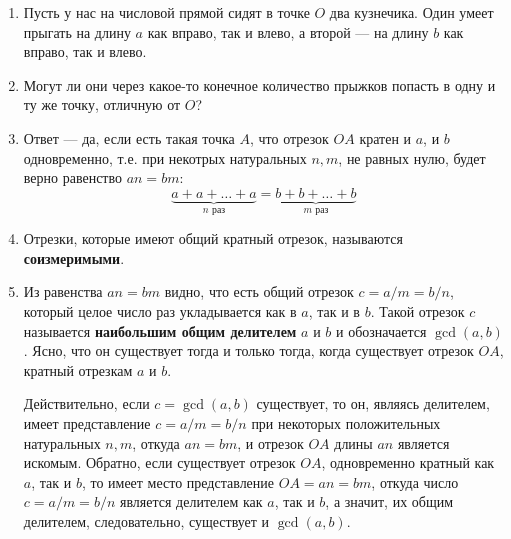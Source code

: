 \begin{enumerate}
\item Пусть у нас на числовой прямой сидят в точке $O$ два кузнечика. Один умеет прыгать на длину $a$ как вправо, так и влево, а второй --- на длину $b$ как вправо, так и влево.

\item Могут ли они через какое-то конечное количество прыжков попасть в одну и ту же точку, отличную от $O$?
\item Ответ --- да, если есть такая точка $A$, что отрезок $OA$ кратен и $a$, и $b$ одновременно, т.е. при некотрых натуральных $n,m$, не равных нулю, будет верно равенство $an=bm$:
$$
\underbrace{a+a+\dots+a}_{n\mbox{ раз}}=\underbrace{b+b+\dots+b}_{m\mbox{ раз}}
$$
\item Отрезки, которые имеют общий кратный отрезок, называются \textbf{соизмеримыми}.
\item Из равенства $an=bm$ видно, что есть общий отрезок $c=a/m=b/n$, который целое число раз укладывается как в $a$, так и в $b$. Такой отрезок $c$ называется \textbf{наибольшим общим делителем} $a$ и $b$ и обозначается $\gcd(a,b)$. Ясно, что он существует тогда и только тогда, когда существует отрезок $OA$, кратный отрезкам $a$ и $b$.

Действительно, если $c=\gcd(a,b)$ существует, то он, являясь делителем, имеет представление $c=a/m=b/n$ при некоторых положительных натуральных $n,m$, откуда $an=bm$, и отрезок $OA$ длины $an$ является искомым. Обратно, если существует отрезок $OA$, одновременно кратный как $a$, так и $b$, то имеет место представление $OA=an=bm$, откуда число $c=a/m=b/n$ является делителем как $a$, так и $b$, а значит, их общим делителем, следовательно, существует и $\gcd(a,b)$.


\end{enumerate}
